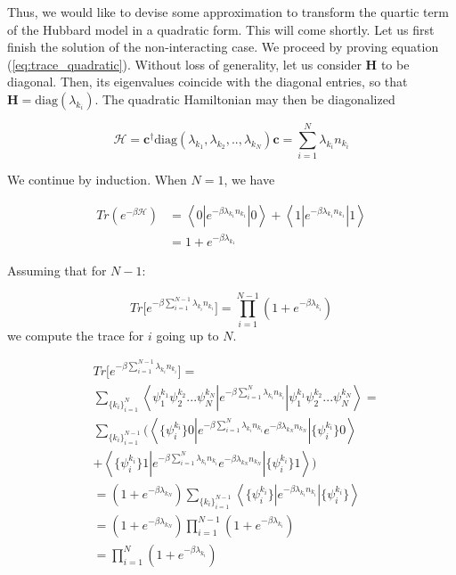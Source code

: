 \documentclass[10pt, twocolumn, twoside]{article}
\begin{document}
\bigskip

Thus, we would like to devise some approximation to transform the quartic term of the Hubbard model in a quadratic form. This will come shortly. Let us first finish the solution of the non-interacting case. We proceed by proving equation (\ref{eq:trace_quadratic}). Without loss of generality, let us consider $\bm H$ to be diagonal. Then, its eigenvalues coincide with the diagonal entries, so that $\bm H = \text{diag}(\lambda_{k_i} )$. The quadratic Hamiltonian may then be  diagonalized

\begin{equation}
\mathcal{H} = {\bm c}^\dagger \text{diag} (\lambda_{k_1}, \lambda_{k_2}, .., \lambda_{k_N}) \bm c = \sum_{i=1}^N \lambda_{k_i} n_{k_i}
\end{equation}

We continue by induction. When $N=1$, we have

\begin{equation}
\begin{split}
Tr (e^{-\beta\mathcal{H} } ) &= \left\langle 0 \left| e^{-\beta \lambda_{k_1} n_{k_1}}  \right| 0 \right\rangle + \left\langle 1 \left| e^{-\beta \lambda_{k_1} n_{k_1}}   \right| 1 \right\rangle \\
&= 1 + e^{-\beta \lambda_{k_1} }
\end{split}
\end{equation}

Assuming that for $N-1$:

\begin{equation}
Tr \big[ e^{-\beta \sum_{i=1}^{N-1} \lambda_{k_i} n_{k_i} } \big] = \prod_{i=1}^{N-1} ( 1 + e^{-\beta \lambda_{k_i} } )
\end{equation}
we compute the trace for $i$ going up to $N$.

\begin{equation}
\begin{split}
&Tr \big[ e^{-\beta \sum_{i=1}^{N-1} \lambda_{k_i} n_{k_i} } \big] = \\
& \sum_{\{ k_i \}_{i=1}^{N} } \left\langle \psi_1^{k_1} \psi_2^{k_2} ... \psi_N^{k_N} \left| e^{-\beta \sum_{i=1}^N \lambda_{k_i} n_{k_i}}  \right| \psi_1^{k_1} \psi_2^{k_2} ... \psi_N^{k_N} \right\rangle = \\
& \sum_{\{ k_i \}_{i=1}^{N-1} } \bigg( \left\langle \{\psi_i^{k_i}\} 0 \left| e^{-\beta \sum_{i=1}^N \lambda_{k_i} n_{k_i}} e^{-\beta \lambda_{k_N} n_{k_N}} \right| \{\psi_i^{k_i}\} 0 \right\rangle \\
&+ \left\langle \{\psi_i^{k_i}\} 1 \left| e^{-\beta \sum_{i=1}^N \lambda_{k_i} n_{k_i}} e^{-\beta \lambda_{k_N} n_{k_N}} \right| \{\psi_i^{k_i}\} 1 \right\rangle \bigg) \\
&= (1 + e^{-\beta \lambda_{k_N} } ) \sum_{\{ k_i \}_{i=1}^{N-1} } \left\langle \{\psi_i^{k_i}\} \left| e^{-\beta \lambda_{k_i} n_{k_i}} \right| \{\psi_i^{k_i}\} \right\rangle \\
&= (1 + e^{-\beta \lambda_{k_N} } ) \prod_{i=1}^{N-1} (1 + e^{-\beta \lambda_{k_i} } ) \\
&= \prod_{i=1}^{N} (1 + e^{-\beta \lambda_{k_i} } )
\end{split}
\end{equation}
\end{document}
